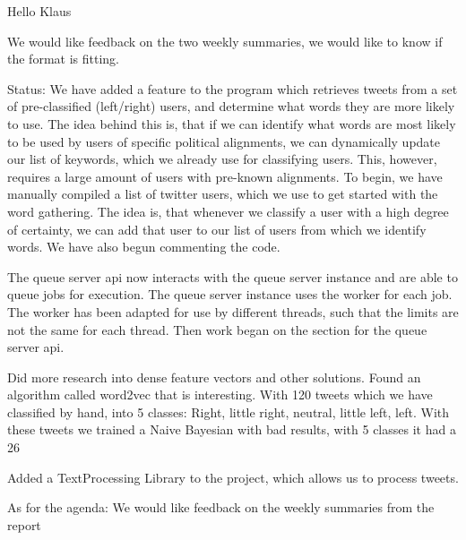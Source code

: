 Hello Klaus

We would like feedback on the two weekly summaries, we would like to know if the format is fitting. 


Status:
We have added a feature to the program which retrieves tweets from a set of pre-classified (left/right) users, and determine what words they are more likely to use. The idea behind this is, that if we can identify what words are most likely to be used by users of specific political alignments, we can dynamically update our list of keywords, which we already use for classifying users. This, however, requires a large amount of users with pre-known alignments. To begin, we have manually compiled a list of twitter users, which we use to get started with the word gathering. The idea is, that whenever we classify a user with a high degree of certainty, we can add that user to our list of users from which we identify words. We have also begun commenting the code.  

The queue server api now interacts with the queue server instance and are able to queue jobs for execution. The queue server instance uses the worker for each job. The worker has been adapted for use by different threads, such that the limits are not the same for each thread. 
Then work began on the section for the queue server api. 

Did more research into dense feature vectors and other solutions. Found an algorithm called word2vec that is interesting.
With 120 tweets which we have classified by hand, into 5 classes: Right, little right, neutral, little left, left. With these tweets we trained a Naive Bayesian with bad results, with 5 classes it had a 26%

Added a TextProcessing Library to the project, which allows us to process tweets.


As for the agenda:
We would like feedback on the weekly summaries from the report
